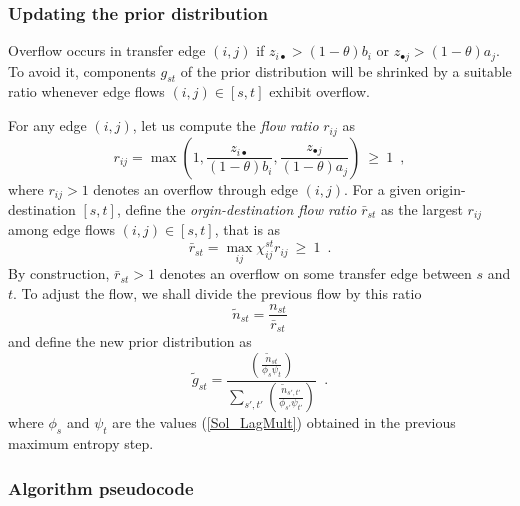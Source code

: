 \documentclass{bmcart}
\begin{document}
\subsubsection{Updating the prior distribution}
\label{priorup}
Overflow occurs in transfer edge $(i, j)$ if  $z_{i \bullet} > (1 - \theta)b_i$ or $z_{\bullet j} > (1 - \theta)a_j$. To avoid it, components $g_{st}$ of the prior distribution 
will be shrinked by a suitable ratio whenever edge flows $(i,j)\in [s,t]$ exhibit overflow. 


 For any edge $(i, j)$, let us compute the \emph{flow ratio} $r_{ij}$ as
\begin{equation}
	\label{flow_ratio}
	r_{ij} = \max \left(1, \frac{z_{i \bullet}}{(1 - \theta)b_i}, \frac{z_{\bullet j}}{(1 - \theta)a_j} \right)\: \ge\: 1\enspace,
\end{equation}
where $r_{ij} > 1$ denotes an overflow through edge $(i, j)$. For a given origin-destination $[s,t]$, define the \emph{orgin-destination flow ratio} $\bar{r}_{st}$ 
as the largest $r_{ij}$ among edge flows $(i,j)\in [s,t]$, that is as 
\begin{equation}
	\label{st_flow_ratio}
	\bar{r}_{st} = \max_{ij} \chi_{ij}^{st} r_{ij}\: \ge\: 1\enspace.
\end{equation}
By construction, $\bar{r}_{st} > 1$ denotes an overflow on some transfer edge between $s$ and $t$. To adjust the flow, we shall divide the previous flow by this ratio
\begin{equation}
	\label{update_flow}
	\widetilde{n}_{st} =\frac{n_{st}}{\bar{r}_{st}}
\end{equation}
and define the new prior distribution  as
\begin{equation}
	\label{update_distrib}
	\widetilde{g}_{st} = \frac{\left( \frac{\widetilde{n}_{st}}{\phi_s \psi_t} \right)}{\sum_{s',t'} \left( \frac{\widetilde{n}_{s',t'}}{\phi_{s'} \psi_{t'}} \right)}\enspace. 
\end{equation}
where $\phi_s$ and $\psi_t$ are the values (\ref{Sol_LagMult}) obtained in the previous maximum entropy step. 

\subsubsection{Algorithm pseudocode}
\end{document}

